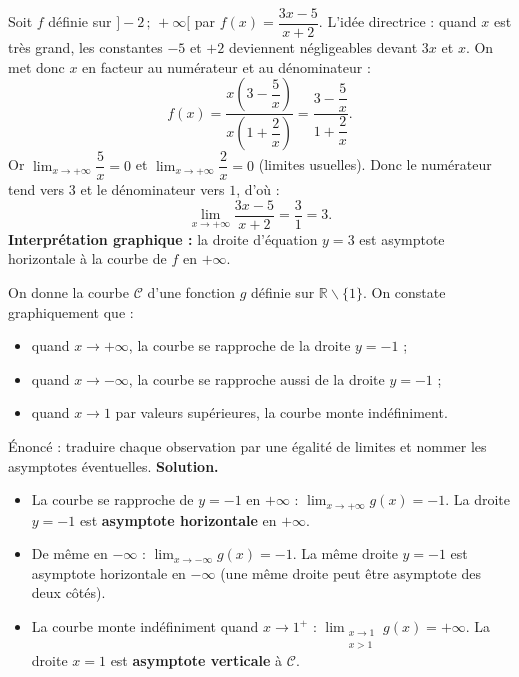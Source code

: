 \documentclass[11pt]{article}
\def\setminus{\mathbin{\backslash}}\let\smallsetminus\setminus
\begin{document}
\begin{exemplebox}
Soit $f$ définie sur $]-2\,;\,+\infty[$ par $f(x) = \dfrac{3x-5}{x+2}$. L'idée directrice : quand $x$ est très grand, les constantes $-5$ et $+2$ deviennent négligeables devant $3x$ et $x$. On met donc $x$ en facteur au numérateur et au dénominateur :
\[ f(x) = \frac{x\left(3 - \dfrac{5}{x}\right)}{x\left(1 + \dfrac{2}{x}\right)} = \frac{3 - \dfrac{5}{x}}{1 + \dfrac{2}{x}}. \]
Or $\lim_{x \to +\infty} \dfrac{5}{x} = 0$ et $\lim_{x \to +\infty} \dfrac{2}{x} = 0$ (limites usuelles). Donc le numérateur tend vers $3$ et le dénominateur vers $1$, d'où :
\[ \lim_{x \to +\infty} \frac{3x-5}{x+2} = \frac{3}{1} = 3. \]
\textbf{Interprétation graphique :} la droite d'équation $y = 3$ est asymptote horizontale à la courbe de $f$ en $+\infty$.
\end{exemplebox}

\begin{exoresolu}
On donne la courbe $\mathscr{C}$ d'une fonction $g$ définie sur $\mathbb{R} \setminus \{1\}$. On constate graphiquement que :
\begin{itemize}
\item quand $x \to +\infty$, la courbe se rapproche de la droite $y = -1$ ;
\item quand $x \to -\infty$, la courbe se rapproche aussi de la droite $y = -1$ ;
\item quand $x \to 1$ par valeurs supérieures, la courbe monte indéfiniment.
\end{itemize}
Énoncé : traduire chaque observation par une égalité de limites et nommer les asymptotes éventuelles.
\tcblower
\textbf{Solution.}
\begin{itemize}
\item La courbe se rapproche de $y = -1$ en $+\infty$ : $\lim_{x \to +\infty} g(x) = -1$. La droite $y = -1$ est \textbf{asymptote horizontale} en $+\infty$.
\item De même en $-\infty$ : $\lim_{x \to -\infty} g(x) = -1$. La même droite $y = -1$ est asymptote horizontale en $-\infty$ (une même droite peut être asymptote des deux côtés).
\item La courbe monte indéfiniment quand $x \to 1^+$ : $\lim_{\substack{x \to 1 \\ x > 1}} g(x) = +\infty$. La droite $x = 1$ est \textbf{asymptote verticale} à $\mathscr{C}$.
\end{itemize}
\end{exoresolu}
\end{document}
